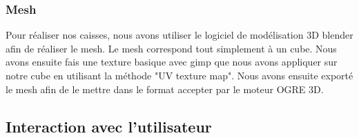 \subsubsection{Mesh}
Pour réaliser nos caisses, nous avons utiliser le logiciel de modélisation 3D
blender afin de réaliser le mesh. Le mesh correspond tout simplement à un
cube. Nous avons ensuite fais une texture basique avec gimp que nous avons
appliquer sur notre cube en utilisant la méthode "UV texture map".
Nous avons ensuite exporté le mesh afin de le mettre dans le format
accepter par le moteur OGRE 3D. 


\subsection{Interaction avec l'utilisateur}

